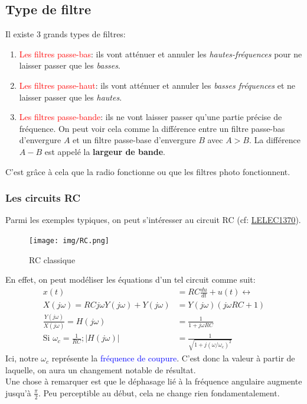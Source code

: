 \documentclass{report}
\begin{document}
\subsection{Type de filtre}
Il existe 3 grands types de filtres:
\begin{enumerate}
\item \textcolor{red}{Les filtres passe-bas}: ils vont atténuer et annuler les \textit{hautes-fréquences} pour ne laisser passer que les \textit{basses}.
\item \textcolor{red}{Les filtres passe-haut}: ils vont atténuer et annuler les \textit{basses fréquences} et ne laisser passer que les \textit{hautes}.
\item \textcolor{red}{Les filtres passe-bande}: ils ne vont laisser passer qu'une partie précise de fréquence. On peut voir cela comme la différence entre un filtre passe-bas d'envergure $A$ et un filtre passe-base d'envergure $B$ avec $A>B$. La différence $A-B$ est appelé la \textbf{largeur de bande}. 
\end{enumerate}
C'est grâce à cela que la radio fonctionne ou que les filtres photo fonctionnent.\\

\newpage %

\subsubsection{Les circuits RC}
Parmi les exemples typiques, on peut s'intéresser au circuit RC (cf: \href{https://github.com/Tfloow/Q4_EPL/blob/main/SyntheseCompilee/LELEC1370.pdf}{LELEC1370}). 
\begin{figure}
\centering
\texttt{[image: img/RC.png]}
\caption{RC classique}
\end{figure}
En effet, on peut modéliser les équations d'un tel circuit comme suit:
\begin{align*}
x(t) &= R C \frac{du}{dt} + u(t) \longleftrightarrow\\
X(j \omega) = RC j \omega Y(j \omega) + Y(j \omega) &= Y(j \omega) (j\omega RC+1)\\
\frac{Y(j \omega)}{X(j \omega)} = H(j \omega) &= \frac{1}{1+ j \omega RC}\\
\text{Si } \omega_c = \frac{1}{RC}; |H(j\omega)| &= \frac{1}{\sqrt{1 + j(\omega / \omega_c)^2}}
\end{align*}
Ici, notre $\omega_c$ représente la \textcolor{blue}{fréquence de coupure}. C'est donc la valeur à partir de laquelle, on aura un changement notable de résultat.\\
Une chose à remarquer est que le déphasage lié à la fréquence angulaire augmente jusqu'à $\frac{\pi}{2}$. Peu perceptible au début, cela ne change rien fondamentalement.
\end{document}
